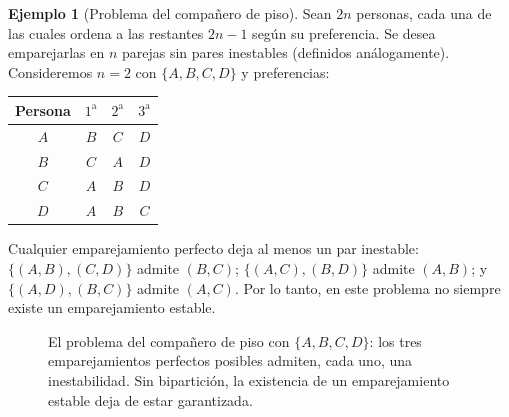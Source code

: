 \documentclass[12pt, spanish, oneside, openany]{book}
\theoremstyle{uprightplain}
\theoremstyle{definition}
\newtheorem{ejemplo}[teorema]{Ejemplo}
\theoremstyle{remark}
\theoremstyle{definition}
\begin{document}
\begin{ejemplo}[Problema del compañero de piso]
\label{ej:roommate}
Sean $2n$ personas, cada una de las cuales ordena a las restantes $2n-1$ según su preferencia. Se desea emparejarlas en $n$ parejas sin pares inestables (definidos análogamente). Consideremos $n=2$ con $\{A,B,C,D\}$ y preferencias:

{\centering
\begin{tabular}{c|ccc}
\toprule
Persona & $1^\text{a}$ & $2^\text{a}$ & $3^\text{a}$ \\
\midrule
$A$ & $B$ & $C$ & $D$ \\
$B$ & $C$ & $A$ & $D$ \\
$C$ & $A$ & $B$ & $D$ \\
$D$ & $A$ & $B$ & $C$ \\
\bottomrule
\end{tabular}\par}

\noindent Cualquier emparejamiento perfecto deja al menos un par inestable: $\{(A,B),(C,D)\}$ admite $(B,C)$; $\{(A,C),(B,D)\}$ admite $(A,B)$; y $\{(A,D),(B,C)\}$ admite $(A,C)$. Por lo tanto, en este problema no siempre existe un emparejamiento estable.
\end{ejemplo}
\begin{figure}[H]
\centering
{}
\caption{El problema del compañero de piso con $\{A,B,C,D\}$: los tres
emparejamientos perfectos posibles admiten, cada uno, una inestabilidad. Sin
bipartición, la existencia de un emparejamiento estable deja de estar
garantizada.}
\label{fig:roommate}
\end{figure}
\end{document}
